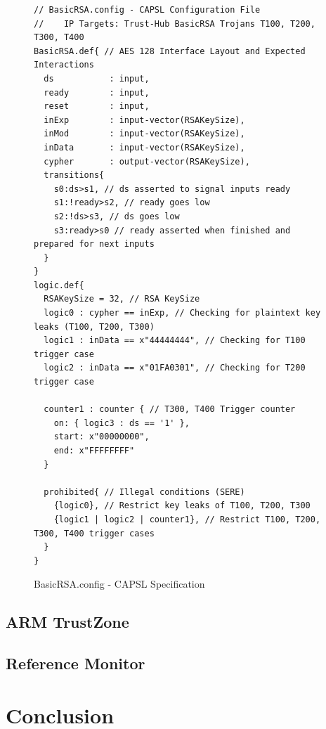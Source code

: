 \documentclass[sigconf]{acmart}
\theoremstyle{plain}
\theoremstyle{remark}
\begin{document}
\begin{figure} [t]
\begin{lstlisting}
// BasicRSA.config - CAPSL Configuration File
//    IP Targets: Trust-Hub BasicRSA Trojans T100, T200, T300, T400
BasicRSA.def{ // AES 128 Interface Layout and Expected Interactions
  ds           : input,
  ready        : input,
  reset        : input,
  inExp        : input-vector(RSAKeySize),
  inMod        : input-vector(RSAKeySize),
  inData       : input-vector(RSAKeySize),
  cypher       : output-vector(RSAKeySize),
  transitions{
    s0:ds>s1, // ds asserted to signal inputs ready
    s1:!ready>s2, // ready goes low
    s2:!ds>s3, // ds goes low
    s3:ready>s0 // ready asserted when finished and prepared for next inputs
  }
}
logic.def{
  RSAKeySize = 32, // RSA KeySize
  logic0 : cypher == inExp, // Checking for plaintext key leaks (T100, T200, T300)
  logic1 : inData == x"44444444", // Checking for T100 trigger case
  logic2 : inData == x"01FA0301", // Checking for T200 trigger case

  counter1 : counter { // T300, T400 Trigger counter
    on: { logic3 : ds == '1' },
    start: x"00000000",
    end: x"FFFFFFFF"
  }

  prohibited{ // Illegal conditions (SERE)
    {logic0}, // Restrict key leaks of T100, T200, T300
    {logic1 | logic2 | counter1}, // Restrict T100, T200, T300, T400 trigger cases
  }
}
\end{lstlisting}
\vspace*{-0.2cm}
\caption{BasicRSA.config - CAPSL Specification}
\label{fig:BasicRSASpec}
\vspace*{-0.3cm}
\end{figure}


\subsection{ARM TrustZone}


\subsection{Reference Monitor}


\section{Conclusion} \label{sec:conclusion}




\end{document}
